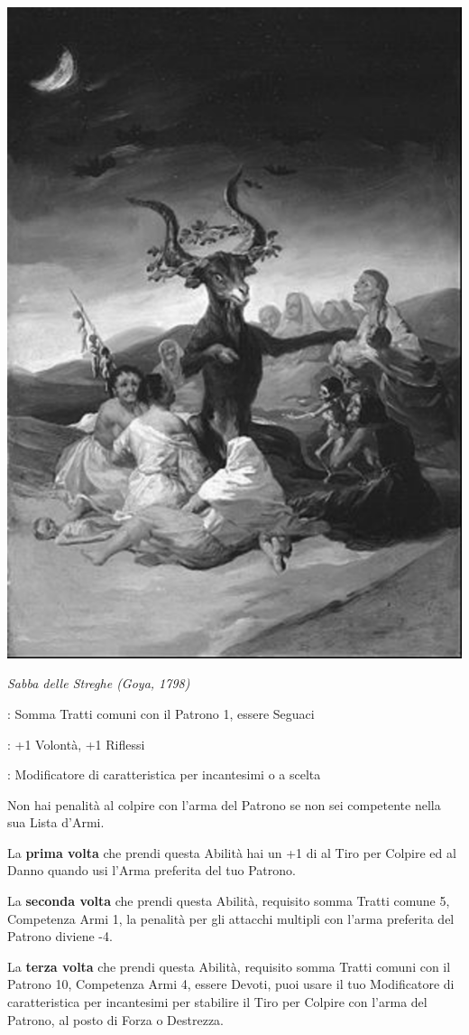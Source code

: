 \begin{multicols}{2}
\begin{center}
	\includegraphics[width=0.56\linewidth]{immagini/streghegoya.png}

	\emph{Sabba delle Streghe (Goya, 1798)}
\end{center}

\begin{description}[noitemsep, topsep=0pt, parsep=0pt, partopsep=0pt, leftmargin=0cm, labelwidth=2.5cm]
    \item[\textbf{Requisito}]: Somma Tratti comuni con il Patrono 1, essere Seguaci
    \item[\textbf{Tiri Salvezza}]: +1 Volontà, +1 Riflessi
    \item[\textbf{Caratteristica}]: Modificatore di caratteristica per incantesimi o a scelta
\end{description}

Non hai penalità al colpire con l'arma del Patrono se non sei competente nella sua Lista d'Armi.

La \textbf{prima volta} che prendi questa Abilità hai un +1 di al Tiro per Colpire ed al Danno quando usi l'Arma preferita del tuo Patrono.

La \textbf{seconda volta} che prendi questa Abilità, requisito somma Tratti comune 5, Competenza Armi 1, la penalità per gli attacchi multipli con l'arma preferita del Patrono diviene -4.

La \textbf{terza volta} che prendi questa Abilità, requisito somma Tratti comuni con il Patrono 10, Competenza Armi 4, essere Devoti, puoi usare il tuo Modificatore di caratteristica per incantesimi per stabilire il Tiro per Colpire con l'arma del Patrono, al posto di Forza o Destrezza.


\end{multicols}
